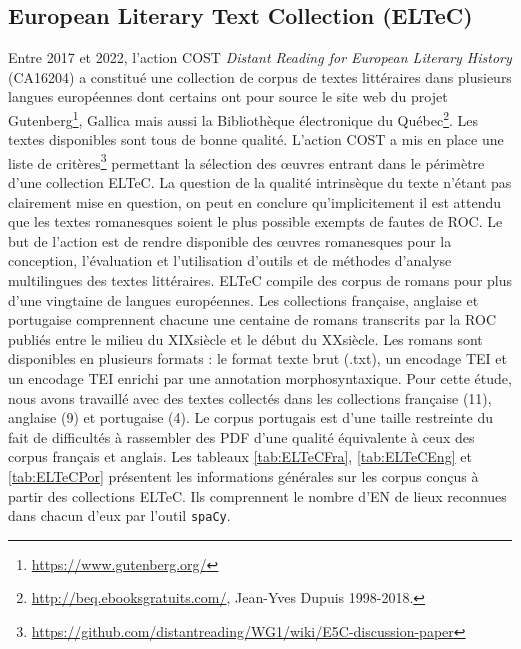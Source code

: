 \subsection{European Literary Text Collection (ELTeC)}

Entre 2017 et 2022, l'action COST \textit{Distant Reading for European Literary History} (CA16204) a constitué une collection de corpus de textes littéraires dans plusieurs langues européennes dont certains ont pour source le site web du projet Gutenberg\footnote{\url{https://www.gutenberg.org/}}, Gallica mais aussi la Bibliothèque électronique du Québec\footnote{\url{http://beq.ebooksgratuits.com/}, Jean-Yves Dupuis 1998-2018.}. Les textes disponibles sont tous de bonne qualité. L'action COST a mis en place une liste de critères\footnote{\url{https://github.com/distantreading/WG1/wiki/E5C-discussion-paper}} permettant la sélection des œuvres entrant dans le périmètre d'une collection ELTeC. La question de la qualité intrinsèque du texte n'étant pas clairement mise en question, on peut en conclure qu'implicitement il est attendu que les textes romanesques soient le plus possible exempts de fautes de ROC. Le but de l'action est de rendre disponible des œuvres romanesques pour la conception, l'évaluation et l'utilisation d'outils et de méthodes d'analyse multilingues des textes littéraires. ELTeC compile des corpus de romans pour plus d'une vingtaine de langues européennes. Les collections française, anglaise et portugaise comprennent chacune une centaine de romans transcrits par la ROC publiés entre le milieu du \textsc{XIX}\ieme{}siècle et le début du \textsc{XX}\ieme{}siècle. Les romans sont disponibles en plusieurs formats : le format texte brut (.txt), un encodage TEI et un encodage TEI enrichi par une annotation morphosyntaxique.
Pour cette étude, nous avons travaillé avec des textes collectés dans les collections française (11), anglaise (9) et portugaise (4). Le corpus portugais est d'une taille restreinte du fait de difficultés à rassembler des PDF d'une qualité équivalente à ceux des corpus français et anglais. Les tableaux \ref{tab:ELTeCFra}, \ref{tab:ELTeCEng} et \ref{tab:ELTeCPor} présentent les informations générales sur les corpus conçus à partir des collections ELTeC. Ils comprennent le nombre d'EN de lieux reconnues dans chacun d'eux par l'outil \texttt{spaCy}.


